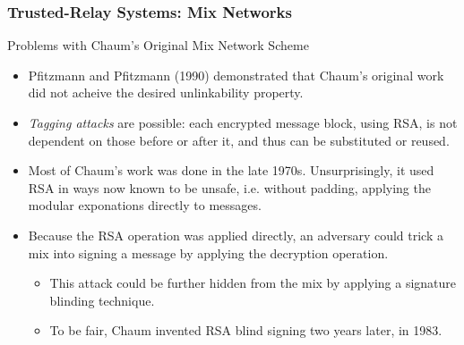 \begin{frame}
  \frametitle{Trusted-Relay Systems: Mix Networks}

  \begin{block}{Problems with Chaum's Original Mix Network Scheme}
    \begin{itemize}
      \item Pfitzmann and Pfitzmann (1990) demonstrated that Chaum's original
        work did not acheive the desired unlinkability property.
      \item<2-> \emph{Tagging attacks} are possible: each encrypted message block,
        using RSA, is not dependent on those before or after it, and thus can be
        substituted or reused.
      \item<3-> Most of Chaum's work was done in the late 1970s.
        Unsurprisingly, it used RSA in ways now known to be unsafe, i.e. without
        padding, applying the modular exponations directly to messages.
      \item<4-> Because the RSA operation was applied directly, an adversary
        could trick a mix into signing a message by applying the decryption
        operation.
        \begin{itemize}
          \item<5-> This attack could be further hidden from the mix by applying
            a signature blinding technique.
          \item<6-> To be fair, Chaum invented RSA blind signing two years later, in
            1983.
        \end{itemize}
    \end{itemize}
  \end{block}
\end{frame}


